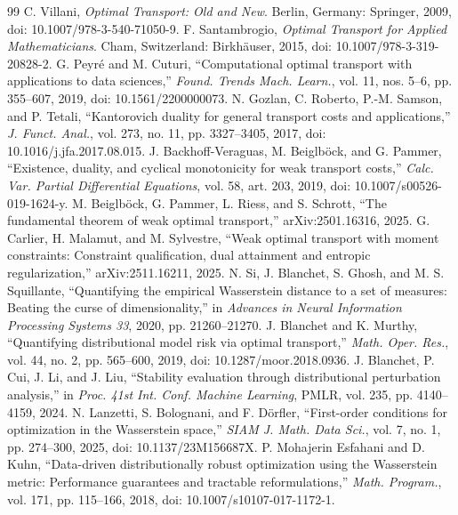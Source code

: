\begin{thebibliography}{99}
 C. Villani, \emph{Optimal Transport: Old and New}. Berlin, Germany: Springer, 2009, doi: 10.1007/978-3-540-71050-9.
 F. Santambrogio, \emph{Optimal Transport for Applied Mathematicians}. Cham, Switzerland: Birkh\"auser, 2015, doi: 10.1007/978-3-319-20828-2.
 G. Peyr\'e and M. Cuturi, ``Computational optimal transport with applications to data sciences,'' \emph{Found. Trends Mach. Learn.}, vol. 11, nos. 5--6, pp. 355--607, 2019, doi: 10.1561/2200000073.
 N. Gozlan, C. Roberto, P.-M. Samson, and P. Tetali, ``Kantorovich duality for general transport costs and applications,'' \emph{J. Funct. Anal.}, vol. 273, no. 11, pp. 3327--3405, 2017, doi: 10.1016/j.jfa.2017.08.015.
 J. Backhoff-Veraguas, M. Beiglb\"ock, and G. Pammer, ``Existence, duality, and cyclical monotonicity for weak transport costs,'' \emph{Calc. Var. Partial Differential Equations}, vol. 58, art. 203, 2019, doi: 10.1007/s00526-019-1624-y.
 M. Beiglb\"ock, G. Pammer, L. Riess, and S. Schrott, ``The fundamental theorem of weak optimal transport,'' arXiv:2501.16316, 2025.
 G. Carlier, H. Malamut, and M. Sylvestre, ``Weak optimal transport with moment constraints: Constraint qualification, dual attainment and entropic regularization,'' arXiv:2511.16211, 2025.
 N. Si, J. Blanchet, S. Ghosh, and M. S. Squillante, ``Quantifying the empirical Wasserstein distance to a set of measures: Beating the curse of dimensionality,'' in \emph{Advances in Neural Information Processing Systems 33}, 2020, pp. 21260--21270.
 J. Blanchet and K. Murthy, ``Quantifying distributional model risk via optimal transport,'' \emph{Math. Oper. Res.}, vol. 44, no. 2, pp. 565--600, 2019, doi: 10.1287/moor.2018.0936.
 J. Blanchet, P. Cui, J. Li, and J. Liu, ``Stability evaluation through distributional perturbation analysis,'' in \emph{Proc. 41st Int. Conf. Machine Learning}, PMLR, vol. 235, pp. 4140--4159, 2024.
 N. Lanzetti, S. Bolognani, and F. D\"orfler, ``First-order conditions for optimization in the Wasserstein space,'' \emph{SIAM J. Math. Data Sci.}, vol. 7, no. 1, pp. 274--300, 2025, doi: 10.1137/23M156687X.
 P. Mohajerin Esfahani and D. Kuhn, ``Data-driven distributionally robust optimization using the Wasserstein metric: Performance guarantees and tractable reformulations,'' \emph{Math. Program.}, vol. 171, pp. 115--166, 2018, doi: 10.1007/s10107-017-1172-1.

\end{thebibliography}
